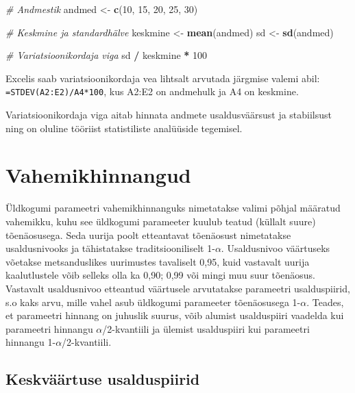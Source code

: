 \documentclass[
]{book}
\newenvironment{Shaded}{\begin{snugshade}}{\end{snugshade}}
\newcommand{\CommentTok}[1]{\textcolor[rgb]{0.56,0.35,0.01}{\textit{#1}}}
\newcommand{\DecValTok}[1]{\textcolor[rgb]{0.00,0.00,0.81}{#1}}
\newcommand{\FunctionTok}[1]{\textcolor[rgb]{0.13,0.29,0.53}{\textbf{#1}}}
\newcommand{\NormalTok}[1]{#1}
\newcommand{\OtherTok}[1]{\textcolor[rgb]{0.56,0.35,0.01}{#1}}
\newcommand{\SpecialCharTok}[1]{\textcolor[rgb]{0.81,0.36,0.00}{\textbf{#1}}}
\renewenvironment{Shaded} {\begin{snugshade}\footnotesize} {\end{snugshade}}
\begin{document}
\begin{Shaded}
\begin{Highlighting}[]
\CommentTok{\# Andmestik}
\NormalTok{andmed }\OtherTok{\textless{}{-}} \FunctionTok{c}\NormalTok{(}\DecValTok{10}\NormalTok{, }\DecValTok{15}\NormalTok{, }\DecValTok{20}\NormalTok{, }\DecValTok{25}\NormalTok{, }\DecValTok{30}\NormalTok{)}

\CommentTok{\# Keskmine ja standardhälve}
\NormalTok{keskmine }\OtherTok{\textless{}{-}} \FunctionTok{mean}\NormalTok{(andmed)}
\NormalTok{sd }\OtherTok{\textless{}{-}} \FunctionTok{sd}\NormalTok{(andmed)}

\CommentTok{\# Variatsioonikordaja viga}
\NormalTok{sd }\SpecialCharTok{/}\NormalTok{ keskmine }\SpecialCharTok{*} \DecValTok{100}
\end{Highlighting}
\end{Shaded}

Excelis saab variatsioonikordaja vea lihtsalt arvutada järgmise valemi abil: \texttt{=STDEV(A2:E2)/A4*100}, kus A2:E2 on andmehulk ja A4 on keskmine.

Variatsioonikordaja viga aitab hinnata andmete usaldusväärsust ja stabiilsust ning on oluline tööriist statistiliste analüüside tegemisel.

\section{Vahemikhinnangud}\label{vahemikhinnangud}

Üldkogumi parameetri vahemikhinnanguks nimetatakse valimi põhjal määratud vahemikku, kuhu see üldkogumi parameeter kuulub teatud (küllalt suure) tõenäosusega. Seda uurija poolt etteantavat tõenäosust nimetatakse usaldusnivooks ja tähistatakse traditsiooniliselt 1-\(\alpha\). Usaldusnivoo väärtuseks võetakse metsanduslikes uurimustes tavaliselt 0,95, kuid vastavalt uurija kaalutlustele võib selleks olla ka 0,90; 0,99 või mingi muu suur tõenäosus. Vastavalt usaldusnivoo etteantud väärtusele arvutatakse parameetri usalduspiirid, s.o kaks arvu, mille vahel asub üldkogumi parameeter tõenäosusega 1-\(\alpha\). Teades, et parameetri hinnang on juhuslik suurus, võib alumist usalduspiiri vaadelda kui parameetri hinnangu \(\alpha\)/2-kvantiili ja ülemist usalduspiiri kui parameetri hinnangu 1-\(\alpha\)/2-kvantiili.

\subsection{Keskväärtuse usalduspiirid}\label{keskvuxe4uxe4rtuse-usalduspiirid}
\end{document}
